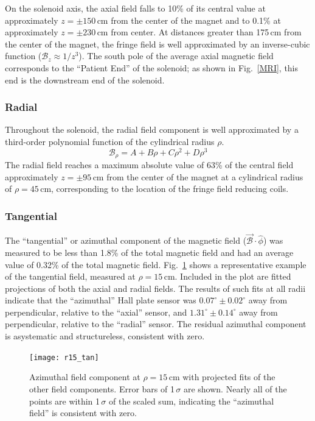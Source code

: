 On the solenoid axis, the axial field falls to 10\% of its central value at approximately $z= \pm150$\,cm from the center of the magnet and to 0.1\% at approximately $z= \pm230$\,cm from center.  At distances greater than 175\,cm from the center of the magnet, the fringe field is well approximated by an inverse-cubic function ($\mathscr{B}_z\approx 1/z^3$).  The south pole of the average axial magnetic field corresponds to the ``Patient End'' of the solenoid; as shown in Fig.~\ref{MRI}, this end is the downstream end of the solenoid.

\subsubsection{Radial}
Throughout the solenoid, the radial field component is well approximated by a third-order polynomial function of the cylindrical radius $\rho$.
\begin{equation}
\mathscr{B}_\rho=A+B\rho+C\rho^2+D\rho^3
\label{eq:radial}
\end{equation}
  The radial field reaches a maximum absolute value of 63\% of the central field approximately $z= \pm95$\,cm from the center of the magnet at a cylindrical radius of $\rho =45$\,cm, corresponding to the location of the fringe field reducing coils.  

\subsubsection{Tangential}
The ``tangential'' or azimuthal component of the magnetic field ($\vec{\mathscr{B}}\cdot\hat{\phi}$) was  measured to be less than 1.8\% of the total magnetic field and had an average value of 0.32\% of the total magnetic field.  Fig.~\ref{tan_field} shows a representative example of the tangential field, measured at $\rho=15$\,cm.  Included in the plot are fitted projections of both the axial and radial fields.  The results of such fits at all radii indicate that the ``azimuthal'' Hall plate sensor was $0.07^\circ \pm 0.02^\circ$ away from perpendicular, relative to the ``axial'' sensor, and $1.31^\circ \pm 0.14^\circ$ away from perpendicular, relative to the ``radial'' sensor.  The residual azimuthal component is asystematic and structureless, consistent with zero.

\begin{figure}%
\texttt{[image: r15\_tan]}%
\caption[Azimuthal  field component at $\rho=15$\,cm with projected fit of the other field components]{Azimuthal  field component at $\rho=15$\,cm with projected fits of the other field components.  Error bars of 1\,$\sigma$ are shown.  Nearly all of the points are within 1\,$\sigma$ of the scaled sum, indicating the ``azimuthal field'' is consistent with zero.}%
\label{tan_field}%
\end{figure}

